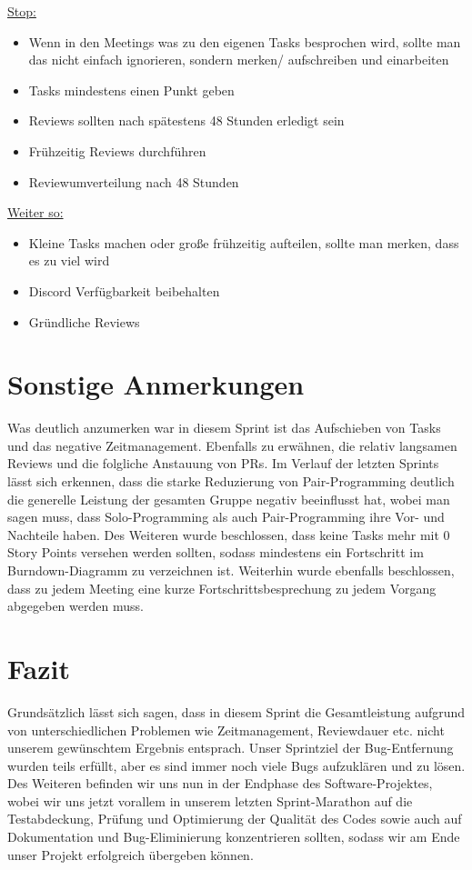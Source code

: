 \documentclass[12pt,a4paper, oneside]{article}
\begin{document}
\underline{Stop:}

\begin{itemize}
    \item Wenn in den Meetings was zu den eigenen Tasks besprochen wird, sollte man das nicht einfach ignorieren, sondern merken/ aufschreiben und einarbeiten
    \item Tasks mindestens einen Punkt geben
    \item Reviews sollten nach spätestens 48 Stunden erledigt sein
    \item Frühzeitig Reviews durchführen
    \item Reviewumverteilung nach 48 Stunden
\end{itemize}

\underline{Weiter so:}

\begin{itemize}
    \item Kleine Tasks machen oder große frühzeitig aufteilen, sollte man merken, dass es zu viel wird
    \item Discord Verfügbarkeit beibehalten
    \item Gründliche Reviews
\end{itemize}

\newpage

\section{Sonstige Anmerkungen}

Was deutlich anzumerken war in diesem Sprint ist das Aufschieben von Tasks und das negative Zeitmanagement.
Ebenfalls zu erwähnen, die relativ langsamen Reviews und die folgliche Anstauung von PRs.
Im Verlauf der letzten Sprints lässt sich erkennen, dass die starke Reduzierung von Pair-Programming deutlich die generelle Leistung der gesamten
Gruppe negativ beeinflusst hat, wobei man sagen muss, dass Solo-Programming als auch Pair-Programming ihre Vor- und Nachteile haben.
Des Weiteren wurde beschlossen, dass keine Tasks mehr mit 0 Story Points versehen werden sollten, sodass mindestens ein Fortschritt im
Burndown-Diagramm zu verzeichnen ist. Weiterhin wurde ebenfalls beschlossen, dass zu jedem Meeting eine kurze Fortschrittsbesprechung zu jedem
Vorgang abgegeben werden muss.

\section{Fazit}

Grundsätzlich lässt sich sagen, dass in diesem Sprint die Gesamtleistung aufgrund von unterschiedlichen Problemen wie Zeitmanagement, Reviewdauer etc.
nicht unserem gewünschtem Ergebnis entsprach. Unser Sprintziel der Bug-Entfernung wurden teils erfüllt, aber es sind immer noch viele Bugs
aufzuklären und zu lösen. Des Weiteren befinden wir uns nun in der Endphase des Software-Projektes, wobei wir uns jetzt vorallem in unserem letzten
Sprint-Marathon auf die Testabdeckung, Prüfung und Optimierung der Qualität des Codes sowie auch auf Dokumentation und Bug-Eliminierung konzentrieren
sollten, sodass wir am Ende unser Projekt erfolgreich übergeben können.
\end{document}
